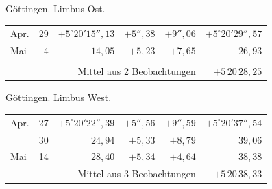 \noindent\begin{minipage}[t]{.495\textwidth}\centering Göttingen. Limbus Ost.\par\smallskip
{\scriptsize\setlength{\tabcolsep}{1pt}\renewcommand{\arraystretch}{1.2}\begin{tabular}{lr|r|r|r|r|}
Apr.&29&$+5^\circ20'15''{,}13$&$+5''{,}38$&$+9''{,}06$&$+5^\circ20'29''{,}57$\\
Mai&4&$14{,}05$&$+5{,}23$&$+7{,}65$&$26{,}93$\\
&&&&&\\
\cline{6-6}\multicolumn{5}{r}{Mittel aus 2 Beobachtungen}&$+5\,20\,28{,}25$
\end{tabular}}\end{minipage}\hfill\begin{minipage}[t]{.495\textwidth}\centering Göttingen. Limbus West.\par\smallskip
{\scriptsize\setlength{\tabcolsep}{1pt}\renewcommand{\arraystretch}{1.2}\begin{tabular}{lr|r|r|r|r}
Apr.&27&$+5^\circ20'22''{,}39$&$+5''{,}56$&$+9''{,}59$&$+5^\circ20'37''{,}54$\\
&30&$24{,}94$&$+5{,}33$&$+8{,}79$&$39{,}06$\\
Mai&14&$28{,}40$&$+5{,}34$&$+4{,}64$&$38{,}38$\\
\cline{6-6}\multicolumn{5}{r}{Mittel aus 3 Beobachtungen}&$+5\,20\,38{,}33$
\end{tabular}}\end{minipage}
\par\vspace{4mm}


